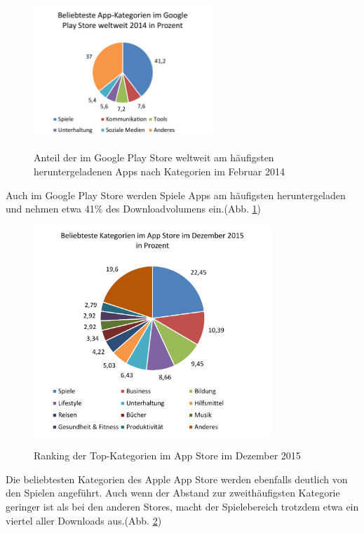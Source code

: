 \begin{figure}[htbp]
	\centering
	\includegraphics[width=0.6\textwidth]{Bilder/Google_Play_Store_Kategorien}
	\caption{Anteil der im Google Play Store weltweit am häufigsten heruntergeladenen Apps nach Kategorien im Februar 2014}\label{graph_play_store_kategorien}\citep{play_store_categories}
\end{figure}

Auch im Google Play Store werden Spiele Apps am häufigsten heruntergeladen und nehmen etwa 41\% des Downloadvolumens ein.(Abb. \ref{graph_play_store_kategorien})

\begin{figure}[htbp]
	\centering
	\includegraphics[width=0.8\textwidth]{Bilder/Top_Kategorien_App_Store}
	\caption{Ranking der Top-Kategorien im App Store im Dezember 2015}\label{graph_app_store_kategorien}\citep{app_store_categories}
\end{figure}

Die beliebtesten Kategorien des Apple App Store werden ebenfalls deutlich von den Spielen angeführt. Auch wenn der Abstand zur zweithäufigsten Kategorie geringer ist als bei den anderen Stores, macht der Spielebereich trotzdem etwa ein viertel aller Downloads aus.(Abb. \ref{graph_app_store_kategorien})
\bigskip

